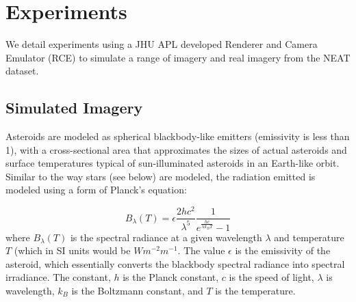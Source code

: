 \section{Experiments}
%
%
%
%
%

\label{sec:experiments}

We  detail experiments using a JHU APL developed Renderer and Camera Emulator (RCE) to simulate a range of imagery and real imagery from the NEAT dataset.  

\subsection{Simulated Imagery}
\label{ssec:simulated}

Asteroids are  modeled as spherical blackbody-like emitters (emissivity is less than 1), with a cross-sectional area that approximates the sizes of actual asteroids and surface temperatures typical of sun-illuminated asteroids in an Earth-like orbit.  Similar to the way stars (see below) are modeled, the radiation emitted is modeled using a form of Planck's equation:

\begin{equation}
\label{eq:Planck}
B_\lambda(T)= \epsilon	\frac{2hc^2}{\lambda^5} \frac{1}{e^{\frac{hc}{\lambda k_BT}} - 1}
\end{equation}
 where $B_\lambda(T)$ is the spectral radiance at a given wavelength $\lambda$ and temperature $T$ (which in SI units would be $Wm^{-2} m^{-1}$. The value $\epsilon$ is the emissivity of the asteroid, which essentially converts the blackbody spectral radiance into spectral irradiance. The constant, $h$ is the Planck constant, $c$ is the speed of light, $\lambda$ is wavelength, $k_B$ is the Boltzmann constant, and $T$ is the temperature. 
 
